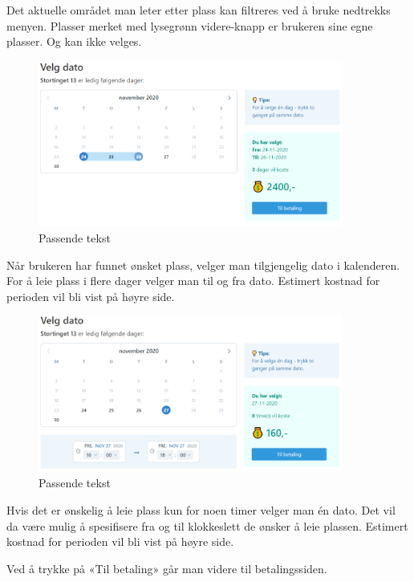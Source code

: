 Det aktuelle området man leter etter plass kan filtreres ved å bruke nedtrekks menyen. Plasser merket med lysegrønn videre-knapp er brukeren sine egne plasser. Og kan ikke velges.

\begin{figure}[H]
    \centering
    \includegraphics[width=10cm]{bilder/Eksempler/velgdato_dager.png}
    \caption{Passende tekst}
    \label{fig:eks:findspots_days}
\end{figure}

Når brukeren har funnet ønsket plass, velger man tilgjengelig dato i kalenderen. For å leie plass i flere dager velger man til og fra dato. Estimert kostnad for perioden vil bli vist på høyre side.

\begin{figure}[H]
    \centering
    \includegraphics[width=10cm]{bilder/Eksempler/velgdato_timer.png}
    \caption{Passende tekst}
    \label{fig:eks:findspots_hour}
\end{figure}

Hvis det er ønskelig å leie plass kun for noen timer velger man én dato. Det vil da være mulig å spesifisere fra og til klokkeslett de ønsker å leie plassen. Estimert kostnad for perioden vil bli vist på høyre side.

Ved å trykke på «Til betaling» går man videre til betalingssiden.

